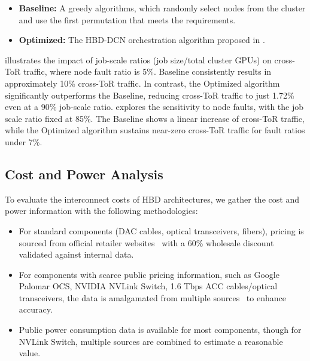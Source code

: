 \begin{itemize}[itemsep=2pt,topsep=0pt,parsep=0pt, leftmargin=2ex]
    \item \textbf{Baseline:} A greedy algorithms, which randomly select nodes from the cluster and use the first permutation that meets the requirements.
    \item \textbf{Optimized:} The HBD-DCN orchestration algorithm proposed in .
\end{itemize}  

 illustrates the impact of job-scale ratios (job size/total cluster GPUs) on cross-ToR traffic, where node fault ratio is 5\%. Baseline consistently results in approximately 10\% cross-ToR traffic. In contrast, the Optimized algorithm significantly outperforms the Baseline, reducing cross-ToR traffic to just 1.72\% even at a 90\% job-scale ratio.
 explores the sensitivity to node faults, with the job scale ratio fixed at 85\%. The Baseline shows a linear increase of cross-ToR traffic, while the Optimized algorithm sustains near-zero cross-ToR traffic for fault ratios under 7\%. 


\vspace{-2ex}
\subsection{Cost and Power Analysis}
\label{sec:simulation:cost-power}



To evaluate the interconnect costs of HBD architectures, we gather the cost and power information with the following methodologies:

\begin{itemize}[itemsep=2pt,topsep=0pt,parsep=0pt, leftmargin=2ex]
    \item For standard components (DAC cables, optical transceivers, fibers), pricing is sourced from official retailer websites~\cite{FS_COM, FIBER_MALL, NADDOD} with a 60\% wholesale discount validated against internal data.
    \item For components with scarce public pricing information, such as Google Palomar OCS, NVIDIA NVLink Switch, 1.6 Tbps ACC cables/optical transceivers, the data is amalgamated from multiple sources~\cite{SEMIANALYSIS_GB200, SEMIANALYSIS_OCS, SEMIANALYSIS_Power} to enhance accuracy.
    \item Public power consumption data is available for most components, though for NVLink Switch, multiple sources are combined to estimate a reasonable value.
\end{itemize}


